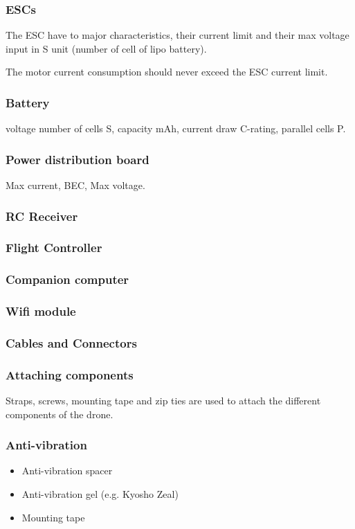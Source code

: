 \subsubsection{ESCs}
The ESC have to major characteristics, their current limit and their max voltage input in S unit (number of cell of lipo battery).

The motor current consumption should never exceed the ESC current limit.

\subsubsection{Battery}
voltage number of cells S, capacity mAh, current draw C-rating, parallel cells P.

\subsubsection{Power distribution board}
Max current, BEC, Max voltage.

\subsubsection{RC Receiver}

\subsubsection{Flight Controller}

\subsubsection{Companion computer}

\subsubsection{Wifi module}

\subsubsection{Cables and Connectors}

\subsubsection{Attaching components}
Straps, screws, mounting tape and zip ties are used to attach the different components of the drone.

\subsubsection{Anti-vibration}
\begin{itemize}
    \item Anti-vibration spacer
    \item Anti-vibration gel (e.g. Kyosho Zeal)
    \item Mounting tape
\end{itemize}

